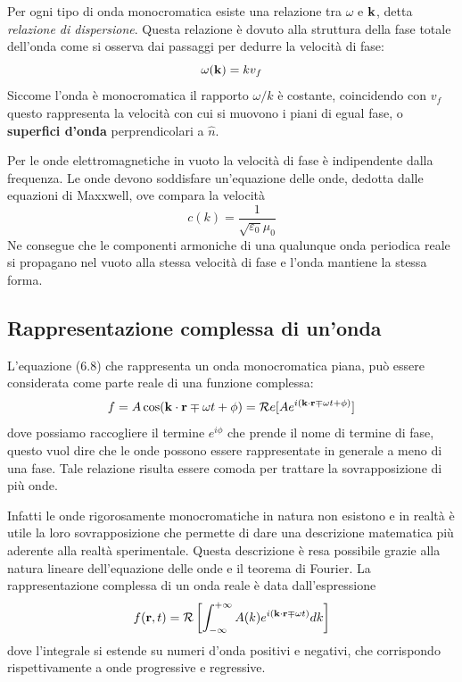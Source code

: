 Per ogni tipo di onda monocromatica esiste una relazione tra $\omega$ e $\bold{k}$, detta \textit{relazione di dispersione}. Questa relazione \`e dovuto alla struttura della fase totale dell'onda come si osserva dai passaggi per dedurre la velocit\`a di fase:
\begin{equation*}
	\omega (\bold{k}) = kv_{f}
\end{equation*}
Siccome l'onda \`e monocromatica il rapporto $\omega/k$ \`e costante, coincidendo con $v_f$ questo rappresenta la velocit\`a con cui si muovono i piani di egual fase, o \textbf{superfici d'onda} perprendicolari a $\hat{n}$.

Per le onde elettromagnetiche in vuoto la velocit\`a di fase \`e indipendente dalla frequenza.  Le onde devono soddisfare un'equazione delle onde, dedotta dalle equazioni di Maxxwell, ove compara la velocit\`a
\begin{equation*}
	c(k) = \frac{1}{\sqrt{\varepsilon_0}\mu_0}
\end{equation*}
Ne consegue che le componenti armoniche di una qualunque onda periodica reale si propagano nel vuoto alla stessa velocit\`a di fase e l'onda mantiene la stessa forma.

\subsection{Rappresentazione complessa di un'onda}
L'equazione (6.8) che rappresenta un onda monocromatica piana, pu\`o essere considerata come parte reale di una funzione complessa:
\begin{equation*}
	f = A\cos(\bold{k} \cdot \bold{r} \mp \omega t  + \phi) = \mathcal{R}e[Ae^{i(\bold{k} \cdot \bold{r} \mp \omega t + \phi)}]
\end{equation*}
dove possiamo raccogliere il termine $e^{i\phi}$ che prende il nome di termine di fase, questo vuol dire che le onde possono essere rappresentate in generale a meno di una fase. Tale relazione risulta essere comoda per trattare la sovrapposizione di pi\`u onde. 

Infatti le onde rigorosamente monocromatiche in natura non esistono e in realt\`a \`e utile la loro sovrapposizione che permette di dare una descrizione matematica pi\`u aderente alla realt\`a sperimentale. Questa descrizione \`e resa possibile grazie alla natura lineare dell'equazione delle onde e il teorema di Fourier. La rappresentazione complessa di un onda reale \`e data dall'espressione 
\begin{equation*}
	f(\bold{r},t) = \mathcal{R} \left[ \int_{- \infty}^{+ \infty} A(k)e^{i(\bold{k} \cdot \bold{r} \mp \omega t )}dk\right]
\end{equation*} 
dove l'integrale si estende su numeri d'onda positivi e negativi, che corrispondo rispettivamente a onde progressive e regressive.

